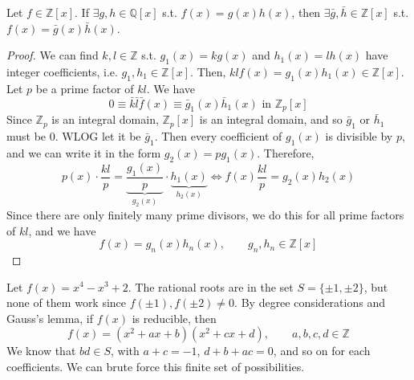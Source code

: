   \begin{lemma}
    Let $f \in \mathbb{Z}[x]$. If $\exists g, h \in \mathbb{Q}[x]$ s.t. $f(x) = g(x) h(x)$, then $\exists \bar{g}, \bar{h} \in \mathbb{Z}[x]$ s.t. $f(x) = \bar{g}(x) \bar{h}(x)$. 
  \end{lemma}
  \begin{proof}
    We can find $k, l \in \mathbb{Z}$ s.t. $g_1 (x) = k g(x)$ and $h_1 (x) = l h(x)$ have integer coefficients, i.e. $g_1, h_1 \in \mathbb{Z}[x]$. Then, $k l f(x) = g_1 (x) h_1 (x) \in \mathbb{Z}[x]$. Let $p$ be a prime factor of $kl$. We have 
    \begin{equation}
      0 \equiv \bar{k} \bar{l} \bar{f} (x) \equiv \bar{g}_1 (x) \bar{h}_1 (x) \text{ in } \mathbb{Z}_p [x]
    \end{equation}
    Since $\mathbb{Z}_p$ is an integral domain, $\mathbb{Z}_p [x]$ is an integral domain, and so $\bar{g}_1$ or $\bar{h}_1$ must be $0$. WLOG let it be $\bar{g}_1$. Then every coefficient of $g_1 (x)$ is divisible by $p$, and we can write it in the form $g_2(x) = p g_1 (x)$. Therefore, 
    \begin{equation}
      p(x) \cdot \frac{kl}{p} = \underbrace{\frac{g_1 (x)}{p}}_{g_2 (x)} \cdot \underbrace{h_1 (x)}_{h_2 (x)} \iff f(x) \frac{kl}{p} = g_2 (x) h_2 (x)
    \end{equation}
    Since there are only finitely many prime divisors, we do this for all prime factors of $kl$, and we have 
    \begin{equation}
      f(x) = g_n (x) h_n (x), \qquad g_n, h_n \in \mathbb{Z}[x]
    \end{equation}
  \end{proof}

  \begin{example}
    Let $f(x) = x^4 - x^3 + 2$. The rational roots are in the set $S = \{\pm 1, \pm2 \}$, but none of them work since $f(\pm1), f(\pm2) \neq 0$. By degree considerations and Gauss's lemma, if $f(x)$ is reducible, then 
    \begin{equation}
      f(x) = (x^2 + ax + b) (x^2 + cx + d), \qquad a, b, c, d \in \mathbb{Z}
    \end{equation}
    We know that $bd \in S$, with $a + c = -1$, $d + b + ac = 0$, and so on for each coefficients. We can brute force this finite set of possibilities. 
  \end{example}

